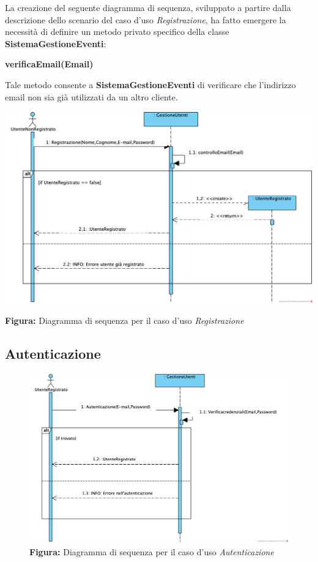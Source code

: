 \begin{center}
    La creazione del seguente diagramma di sequenza, sviluppato a partire dalla descrizione dello scenario del caso d’uso \textit{Registrazione}, ha fatto emergere la necessità di definire un metodo privato specifico della classe \textbf{SistemaGestioneEventi}:

    \vspace{1ex}
    \textbf{verificaEmail(Email)}

    \vspace{2ex}
    Tale metodo consente a \textbf{SistemaGestioneEventi} di verificare che l’indirizzo email  non sia già utilizzati da un altro cliente.

    \vspace{3ex}
    \includegraphics[width=0.8\linewidth]{assets/casid'uso/Registrazione.png}
    
    \vspace{1ex}
    \textbf{Figura:} Diagramma di sequenza per il caso d’uso \textit{Registrazione}
\end{center}
\subsection{Autenticazione}
\begin{figure}[!ht]
    \hspace*{4cm} 
    \includegraphics[width=0.8\linewidth]{assets/casid'uso/Autenticazione.png}
	\vspace{1ex}
    \textbf{Figura:} Diagramma di sequenza per il caso d’uso \textit{Autenticazione}
\end{figure}
